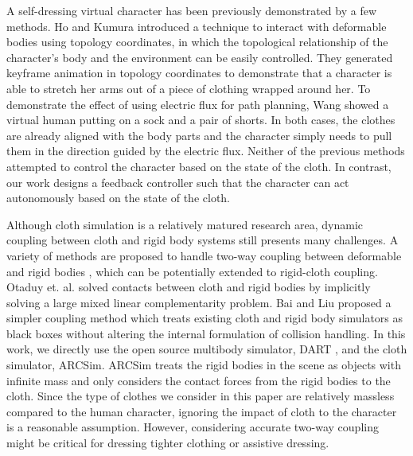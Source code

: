 A self-dressing virtual character has been previously demonstrated by a few methods. Ho and Kumura  introduced a technique to interact with deformable bodies using topology coordinates, in which the topological relationship of the character's body and the environment can be easily controlled. They generated keyframe animation in topology coordinates to demonstrate that a character is able to stretch her arms out of a piece of clothing wrapped around her. To demonstrate the effect of using electric flux for path planning, Wang \etal {} showed a virtual human putting on a sock and a pair of shorts. In both cases, the clothes are already aligned with the body parts and the character simply needs to pull them in the direction guided by the electric flux. Neither of the previous methods attempted to control the character based on the state of the cloth. In contrast, our work designs a feedback controller such that the character can act autonomously based on the state of the cloth.


Although cloth simulation is a relatively matured research area, dynamic coupling between cloth and rigid body systems still presents many challenges. A variety of methods are proposed to handle two-way coupling between deformable and rigid bodies \cite{Jansson:2003:CDR,Sifakis:2007:HSD,Shinar:2008:TCR,Otaduy:2009:ICH,Miguel:2011:ESC}, which can be potentially extended to rigid-cloth coupling. Otaduy et. al. \cite{Otaduy:2009:ICH} solved contacts between cloth and rigid bodies by implicitly solving a large mixed linear complementarity problem. Bai and Liu \cite{Bai:2014:CCR} proposed a simpler coupling method which treats existing cloth and rigid body simulators as black boxes without altering the internal formulation of collision handling. In this work, we directly use the open source multibody simulator, DART \cite{Liu:2012:STM}, and the cloth simulator, ARCSim\cite{Narain:2012:AAR,Narain:2013:FCA}. ARCSim treats the rigid bodies in the scene as objects with infinite mass and only considers the contact forces from the rigid bodies to the cloth. Since the type of clothes we consider in this paper are relatively massless compared to the human character, ignoring the impact of cloth to the character is a reasonable assumption. However, considering accurate two-way coupling might be critical for dressing tighter clothing or assistive dressing.

